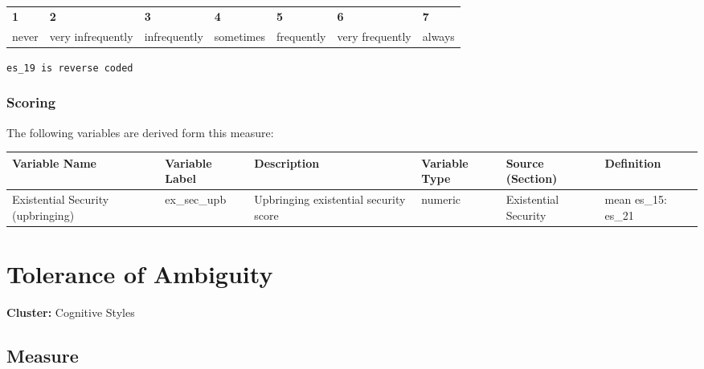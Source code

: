 \documentclass[
  letterpaper,
]{scrbook}
\begin{document}
\begin{longtable}[]{@{}
  >{\raggedright\arraybackslash}p{}
  >{\raggedright\arraybackslash}p{}
  >{\raggedright\arraybackslash}p{}
  >{\raggedright\arraybackslash}p{}
  >{\raggedright\arraybackslash}p{}
  >{\raggedright\arraybackslash}p{}
  >{\raggedright\arraybackslash}p{}@{}}
\toprule\noalign{}
\endhead
\bottomrule\noalign{}
\endlastfoot
\textbf{1} & \textbf{2} & \textbf{3} & \textbf{4} & \textbf{5} &
\textbf{6} & \textbf{7} \\
never & very infrequently & infrequently & sometimes & frequently & very
frequently & always \\
\end{longtable}

\texttt{es\_19\ is\ reverse\ coded}

\subsection{Scoring}\label{scoring-15}

The following variables are derived form this measure:

\begin{tabu} to 
\toprule
Variable Name & Variable Label & Description & Variable Type & Source (Section) & Definition\\
\midrule
Existential Security (upbringing) & ex\_sec\_upb & Upbringing existential security score & numeric & Existential Security & mean es\_15: es\_21\\
\bottomrule
\end{tabu}

\chapter{Tolerance of Ambiguity}\label{tolerance-of-ambiguity}

\textbf{Cluster:} Cognitive Styles

\section{Measure}\label{measure-16}
\end{document}
